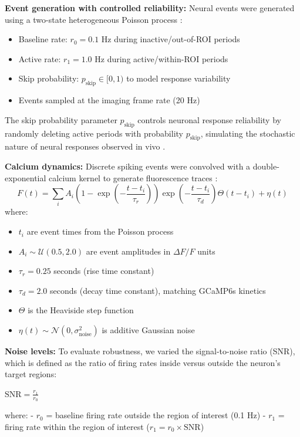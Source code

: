 \textbf{Event generation with controlled reliability:} Neural events were generated
using a two-state heterogeneous Poisson process \citep{Borst1999}:
\begin{itemize}
\item Baseline rate: $r_0 = 0.1$ Hz during inactive/out-of-ROI periods
\item Active rate: $r_1 = 1.0$ Hz during active/within-ROI periods
\item Skip probability: $p_{\text{skip}} \in [0, 1)$ to model response variability
\item Events sampled at the imaging frame rate (20 Hz)
\end{itemize}

The skip probability parameter $p_{\text{skip}}$ controls neuronal response
reliability by randomly deleting active periods with probability $p_{\text{skip}}$,
simulating the stochastic nature of neural responses observed in vivo
\citep{Grijseels2021}.

\textbf{Calcium dynamics:} Discrete spiking events were convolved with a
double-exponential calcium kernel to generate fluorescence traces
\citep{Zhang2023}:
\begin{equation}
\label{eq:calcium_dynamics}
F(t) = \sum_i A_i \left(1 - \exp\!\left(-\frac{t - t_i}{\tau_r}\right)\right)
\exp\!\left(-\frac{t - t_i}{\tau_d}\right) \Theta(t - t_i) + \eta(t)
\end{equation}
where:
\begin{itemize}
\item $t_i$ are event times from the Poisson process
\item $A_i \sim \mathcal{U}(0.5, 2.0)$ are event amplitudes in $\Delta F/F$ units
\item $\tau_r = 0.25$ seconds (rise time constant)
\item $\tau_d = 2.0$ seconds (decay time constant), matching GCaMP6s kinetics
\item $\Theta$ is the Heaviside step function
\item $\eta(t) \sim \mathcal{N}(0, \sigma_{\text{noise}}^2)$ is additive Gaussian
noise
\end{itemize}

\textbf{Noise levels:} To evaluate robustness, we varied the signal-to-noise ratio
(SNR), which is defined as the ratio of firing rates inside versus outside the
neuron's target regions:

$\text{SNR} = \frac{r_1}{r_0}$

where:
- $r_0$ = baseline firing rate outside the region of interest (0.1 Hz)
- $r_1$ = firing rate within the region of interest ($r_1 = r_0 \times \text{SNR}$)

